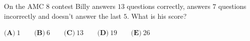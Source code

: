 On the AMC 8 contest Billy answers $13$ questions correctly, answers $7$ questions incorrectly and doesn't answer the last $5$. What is his score?

$\textbf{(A)}\ 1\qquad\textbf{(B)}\ 6\qquad\textbf{(C)}\ 13\qquad\textbf{(D)}\ 19\qquad\textbf{(E)}\ 26$
